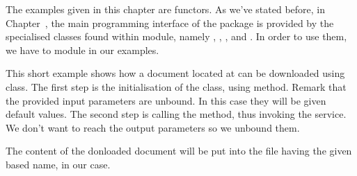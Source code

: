 \documentclass{ozdoc}
\begin{document}
\label{CHAPTER.EXAMPLES}



The examples given in this chapter are functors. As we've stated before, in Chapter~, the main programming interface of the  package is provided by the specialised classes found within  module, namely , , ,  and . In order to use them, we have to   module in our examples.  \mozartEMPTY





This short example shows how a document located at  can be downloaded using  class. The first step is the initialisation of the class, using  method. Remark that the provided input parameters are unbound. In this case they will be given default values. The second step is calling the  method, thus invoking the service. We don't want to reach the output parameters so we unbound them.

The content of the donloaded document will be put into the file having the given  based name,  in our case. \mozartEMPTY
 \mozartEMPTY


\end{document}
